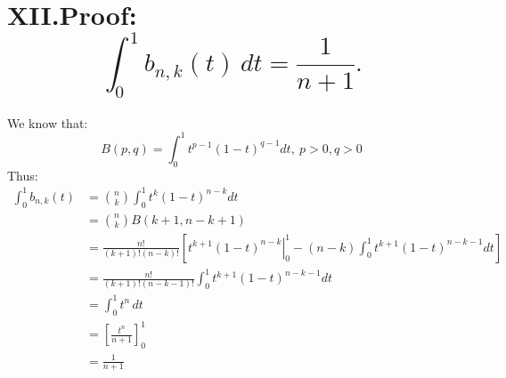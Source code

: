 \documentclass[a4paper]{article}
\begin{document}
\section*{XII.Proof: \[\int_{0}^{1} b_{n,k}(t) \, dt = \frac{1}{n+1}.\] }

We know that:\[ B(p, q) = \int_0^1 t^{p-1} (1-t)^{q-1}dt,\ p>0,q>0\]
Thus:
\begin{align*}
  \int_0^1 b_{n,k}(t) &= \binom{n}{k}\int_0^1 t^k (1-t)^{n-k}dt \\
  &= \binom{n}{k}B(k+1,n-k+1) \\
  &= \frac{n!}{(k+1)!(n-k)!} \left[ \left. t^{k+1}(1-t)^{n-k} \right|_{0}^{1} - (n-k)\int_{0}^{1} t^{k+1} (1-t)^{n-k-1} dt  \right]\\
   &= \frac{n!}{(k+1)!(n-k-1)!} \int_0^1t^{k+1}(1-t)^{n-k-1}dt    \\
   &= \int_0^1 t^n \, dt \\
   &= \left[ \frac{t^n}{n+1} \right]_0^1\\
  &= \frac{1}{n+1} \\
\end{align*}

\end{document}
